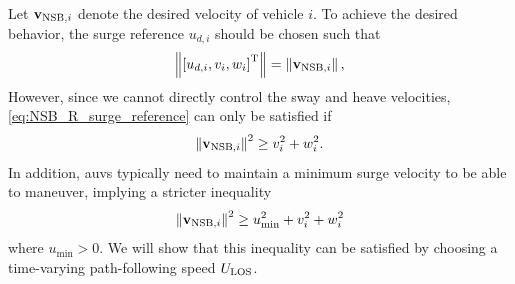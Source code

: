\noindent Let $\mathbf{v}_{{\rm NSB}, i}$ denote the desired velocity of vehicle $i$.    
To achieve the desired behavior, the surge reference $u_{d, i}$ should be chosen such that
\begin{equation}
    \left\|\left[u_{d, i}, v_i, w_i\right]^{\mathrm{T}}\right\| = \left\|\mathbf{v}_{{\rm NSB}, i}\right\|,
    \label{eq:NSB_R_surge_reference}
\end{equation}
However, since we cannot directly control the sway and heave velocities, \eqref{eq:NSB_R_surge_reference} can only be satisfied if 
\begin{equation}
    \left\|\mathbf{v}_{{\rm NSB}, i}\right\|^2 \geq v_i^2 + w_i^2.
\end{equation}
In addition, \glspl{auv} typically need to maintain a minimum surge velocity to be able to maneuver, implying a stricter inequality 
\begin{equation}
    \left\|\mathbf{v}_{{\rm NSB}, i}\right\|^2 \geq u_{\min}^2 + v_i^2 + w_i^2
    \label{eq:NSB_R_NSB_speed_condition}
\end{equation}
where $u_{\min} > 0$.
We will show that this inequality can be satisfied by choosing a time-varying path-following speed $U_{\rm LOS}$.



